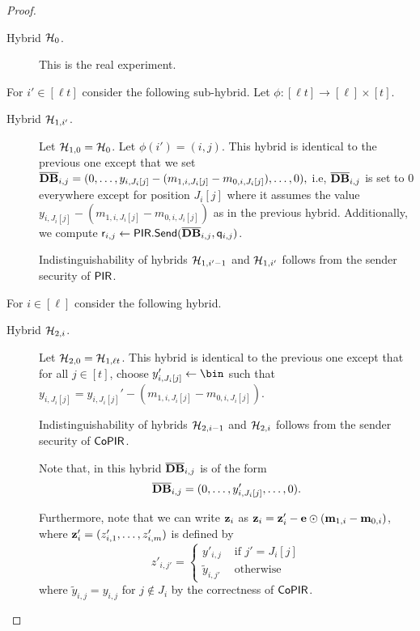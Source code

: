 \begin{proof}
\begin{description}
\item[Hybrid $\mathcal{H}_0$.] This is the real experiment.
\end{description}

For $i'\in[\ell t]$ consider the following sub-hybrid. Let $\phi:[\ell t]\to[\ell]\times [t]$.

\begin{description}
\item[Hybrid $\mathcal{H}_{1,i'}$.] Let $\mathcal{H}_{1,0}=\mathcal{H}_0$. Let $\phi(i')=(i,j)$. This hybrid is identical to the previous one except that we set $\overline{\mathbf{DB}}_{i,j}=(0,\dots, y_{i,J_i[j]}-(m_{1,i,J_i[j]}-m_{0,i,J_i[j]}),\dots ,0),$ i.e, $\overline{\mathbf{DB}}_{i,j}$ is set to $0$ everywhere except for position $J_i[j]$ where it assumes the value  $y_{i,J_i[j]}-(m_{1,i,J_i[j]}-m_{0,i,J_i[j]})$ as in the previous hybrid. Additionally, we compute $\mathsf{r}_{i,j}\gets\mathsf{PIR}.\mathsf{Send}(\overline{\mathbf{DB}}_{i,j},\mathsf{q}_{i,j})$.

Indistinguishability of hybrids $\mathcal{H}_{1,i'-1}$ and $\mathcal{H}_{1,i'}$ follows from the sender security of $\mathsf{PIR}$.
\end{description}


For $i\in[\ell]$ consider the following hybrid.

\begin{description}
\item[Hybrid $\mathcal{H}_{2,i}$.] Let $\mathcal{H}_{2,0}=\mathcal{H}_{1,\ell t}$. This hybrid is identical to the previous one except that for all $j\in[t]$, choose $y_{i,J_i[j]}'\leftarrow\bin$ such that $y_{i,J_i[j]}=y_{i,J_i[j]}'-(m_{1,i,J_i[j]}-m_{0,i,J_i[j]})$.

Indistinguishability of hybrids $\mathcal{H}_{2,i-1}$ and $\mathcal{H}_{2,i}$ follows from the sender security of $\mathsf{CoPIR}$.

Note that, in this hybrid $\overline{\mathbf{DB}}_{i,j}$ is of the form $$\overline{\mathbf{DB}}_{i,j}=(0,\dots, y'_{i,J_i[j]},\dots, 0).$$

 Furthermore, note that we can write $\mathbf{z}_{i}$ as $\mathbf{z}_{i} = \mathbf{z}'_{i} - \mathbf{e}\odot (\mathbf{m}_{1,i}-\mathbf{m}_{0,i})$, where $\mathbf{z}'_{i}=(z_{i,1}',\dots,z_{i,m}')$ is defined by
 \[
 z'_{i,j'} = \begin{cases} y'_{i,j} & \text{ if } j' = J_i[j]\\ \tilde{y}_{i,j'} & \text{ otherwise}\end{cases}
 \] where $\tilde{y}_{i,j}=y_{i,j}$ for $j\notin J_i$ by the correctness of $\mathsf{CoPIR}$.
\end{description}


\end{proof}
